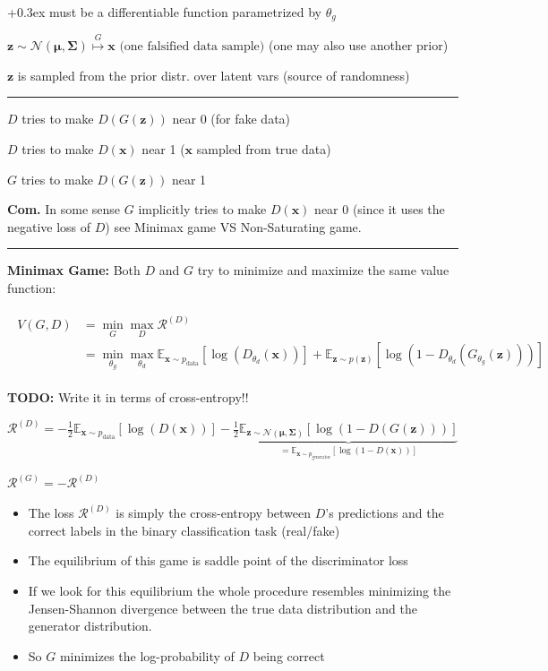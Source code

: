 \documentclass[a2paper,4pt]{extarticle}
\newcommand{\cN}{\mathcal{N}}
\newcommand{\cR}{\mathcal{R}}
\newcommand{\Exp}[2][]{{\mathbb{E}_{#1}}\left[ #2
\right]}
\newcommand{\mat}[1]{\mathbf{#1}}
\renewcommand{\vec}[1]{\mathbf{#1}}
\newcommand{\vx}{\vec{x}}
\newcommand{\vz}{\vec{z}}
\newcommand{\vmu}{\boldsymbol{\mu}}
\newcommand{\MSigma}{\mat{\Sigma}}
\newcommand{\todo}[1]{\textbf{TODO:} #1}
\newcommand{\todo}[1]{%
}
\newcommand{\customboxpaddingsize}{0pt}
\newcommand{\emptyarg}[1][]{\ifthenelse{\isempty{#1}}{}{\ (#1)}}
\newcommand{\Def}[1][]{{\setlength\fboxsep{\customboxpaddingsize}
\colorbox{defcolor}{%
\color{custtitlecolor}{\textbf{D.\emptyarg[#1]}}}\kern+0.3ex}}
\newcommand{\Com}{\textbf{Com.} }
\newcommand{\sep}{\vspace{0pt}\noindent\hrule\vspace{0pt}}
\newcommand{\sep}{\vspace{5pt}\noindent\hrule\vspace{5pt}}
\begin{document}
\begin{landscape}
\begin{multicols*}{7}
\Def[Generator $G$] must be a differentiable function parametrized by $\theta_g$

$
\vz\sim\cN(\vmu,\MSigma)
\stackrel{G}{\mapsto}
\vx
\text{ (one falsified data sample)}
$ (one may also use another prior)

$\vz$ is sampled from the prior distr. over latent vars (source of randomness)

\sep

$D$ tries to make $D(G(\vz))$ near 0 (for fake data)

$D$ tries to make $D(\vx)$ near 1 ($\vx$ sampled from true data)

$G$ tries to make $D(G(\vz))$ near 1

\Com In some sense $G$ implicitly tries to make $D(\vx)$ near 0 (since it uses
the negative loss of $D$) see Minimax game VS Non-Saturating game.

\sep

\textbf{Minimax Game:} Both $D$ and $G$ try to minimize and maximize the same
value function:

\begin{gather*}
\begin{align*}
V(G,D)
&=\min_{G}\max_{D} \cR^{(D)}
\\
&=\min_{\theta_g}\max_{\theta_d}
\Exp[\vx\sim p_{\text{data}}]{\log(D_{\theta_d}(\vx))}
+
\Exp[\vz\sim p(\vz)]{\log(1-D_{\theta_d}(G_{\theta_g}(\vz)))}
\end{align*}
\end{gather*}

\todo{Write it in terms of cross-entropy!!}

$
\cR^{(D)}
=
-\frac{1}{2}
\Exp[\vx\sim p_{\text{data}}]{\log(D(\vx))}
-\frac{1}{2}
\underbrace{\Exp[\vz\sim \cN(\vmu,\MSigma)]{\log(1-D(G(\vz)))}}_{=
\Exp[\vx\sim p_{\text{generator}}]{\log(1-D(\vx))}}
$

$
\cR^{(G)}
=
-\cR^{(D)}
$ 

\begin{itemize}
  \item The loss $\cR^{(D)}$ is simply the cross-entropy between $D$'s
  predictions and the correct labels in the binary classification task (real/fake)
  \item The equilibrium of this game is saddle point of the discriminator loss
  \item If we look for this equilibrium the whole procedure resembles
  minimizing the Jensen-Shannon divergence between the true data distribution
  and the generator distribution.
  \item So $G$ minimizes the log-probability of $D$ being correct
\end{itemize}


\end{multicols*}
\end{landscape}
\end{document}
